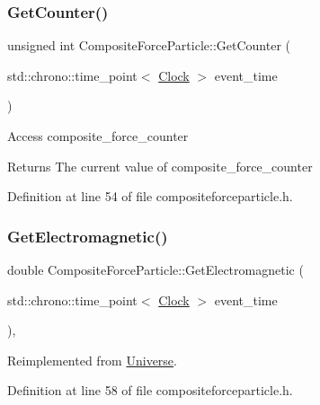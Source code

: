 \subsubsection{\texorpdfstring{Get\+Counter()}{GetCounter()}}
{\footnotesize\ttfamily unsigned int Composite\+Force\+Particle\+::\+Get\+Counter (\begin{DoxyParamCaption}\item[{std\+::chrono\+::time\+\_\+point$<$ \hyperlink{universe_8h_a0ef8d951d1ca5ab3cfaf7ab4c7a6fd80}{Clock} $>$}]{event\+\_\+time }\end{DoxyParamCaption})\hspace{0.3cm}{\ttfamily [inline]}}

Access composite\+\_\+force\+\_\+counter \begin{DoxyReturn}{Returns}
The current value of composite\+\_\+force\+\_\+counter 
\end{DoxyReturn}


Definition at line 54 of file compositeforceparticle.\+h.

\mbox{\label{class_composite_force_particle_a8ef336fed7e33d52a3baae4bd4dd32fd}} 
\subsubsection{\texorpdfstring{Get\+Electromagnetic()}{GetElectromagnetic()}}
{\footnotesize\ttfamily double Composite\+Force\+Particle\+::\+Get\+Electromagnetic (\begin{DoxyParamCaption}\item[{std\+::chrono\+::time\+\_\+point$<$ \hyperlink{universe_8h_a0ef8d951d1ca5ab3cfaf7ab4c7a6fd80}{Clock} $>$}]{event\+\_\+time }\end{DoxyParamCaption})\hspace{0.3cm}{\ttfamily [inline]}, {\ttfamily [virtual]}}



Reimplemented from \hyperlink{class_universe_a63b850ef3f3394313353109d222bf5d1}{Universe}.



Definition at line 58 of file compositeforceparticle.\+h.

\mbox{\label{class_composite_force_particle_ac26d7aab0daefcf13c68aba9e0f2ed53}} 
